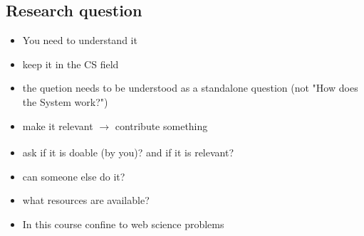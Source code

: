 \documentclass[a4paper]{article}
\begin{document}
	\subsection{Research question}
		\begin{itemize}
		\setlength{\itemsep}{-3pt}
		\item You need to understand it
		\item keep it in the CS field
		\item the quetion needs to be understood as a standalone question (not "How does the System 
		work?")
		\item make it relevant $\xrightarrow[]{}$ contribute something
		\item ask if it is doable (by you)? and if it is relevant?
		\item can someone else do it? 
		\item what resources are available?
		\item In this course confine to web science problems
		\end{itemize}
\end{document}
